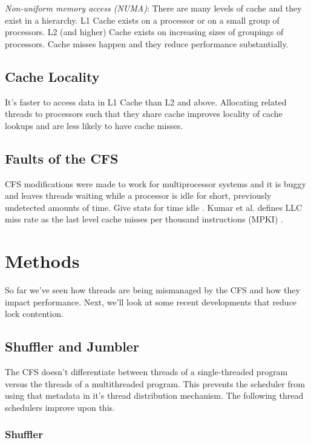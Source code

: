\documentclass{sig-alternate}
\begin{document}
\textit{Non-uniform memory access (NUMA)}:
There are many levels of cache and they exist in a hierarchy. L1 Cache exists on a processor or on a small group of processors. L2 (and higher) Cache exists on increasing sizes of groupings of processors.
Cache misses happen and they reduce performance substantially.

\subsection{Cache Locality}
\label{sec:cachelocality}

It's faster to access data in L1 Cache than L2 and above. Allocating related threads to processors such that they share cache improves locality of cache lookups and are less likely to have cache misses.

\subsection{Faults of the CFS}
\label{sec:cfsfaults}

CFS modifications were made to work for multiprocessor systems and it is buggy and leaves threads waiting while a processor is idle for short, previously undetected amounts of time. Give stats for time idle \cite{Lozi:2016}. Kumar et al. defines LLC miss rate as the last level cache misses per thousand instructions (MPKI) \cite{KumarEtal:2014}.

\section{Methods}
\label{sec:methods}

So far we've seen how threads are being mismanaged by the CFS and how they impact performance. Next, we'll look at some recent developments that reduce lock contention.

\subsection{Shuffler and Jumbler}
\label{sec:sj}

The CFS doesn't differentiate between threads of a single-threaded program versus the threads of a multithreaded program. This prevents the scheduler from using that metadata in it's thread distribution mechanism. The following thread schedulers improve upon this.

\subsubsection{Shuffler}
\label{sec:shuffler}
\end{document}
